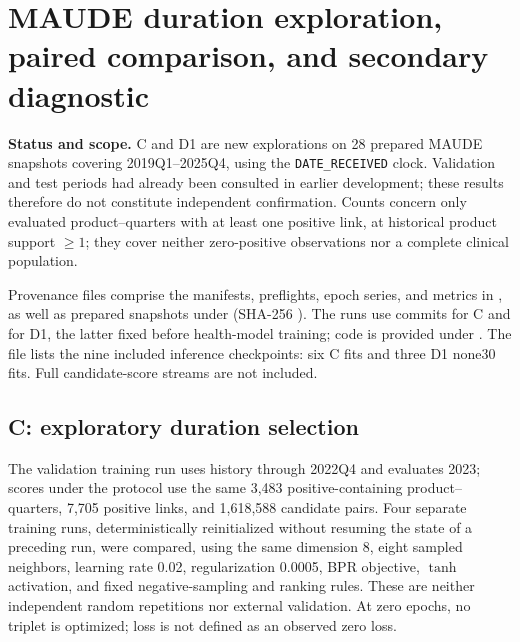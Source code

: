 \par{}
\section{MAUDE duration exploration, paired comparison, and secondary diagnostic}
\label{supp:post-rc1}

\textbf{Status and scope.} C and D1 are new explorations on 28 prepared MAUDE snapshots covering 2019Q1--2025Q4, using the \texttt{DATE\_RECEIVED} clock. Validation and test periods had already been consulted in earlier development; these results therefore do not constitute independent confirmation. Counts concern only evaluated product--quarters with at least one positive link, at historical product support $\geq1$; they cover neither zero-positive observations nor a complete clinical population.

Provenance files comprise the manifests, preflights, epoch series, and metrics in , as well as prepared snapshots under  (SHA-256 ). The runs use commits  for C and  for D1, the latter fixed before health-model training; code is provided under . The file  lists the nine included inference checkpoints: six C fits and three D1 none30 fits. Full candidate-score streams are not included.

\subsection{C: exploratory duration selection}

The validation training run uses history through 2022Q4 and evaluates 2023; scores under the protocol use the same 3,483 positive-containing product--quarters, 7,705 positive links, and 1,618,588 candidate pairs. Four separate training runs, deterministically reinitialized without resuming the state of a preceding run, were compared, using the same dimension 8, eight sampled neighbors, learning rate 0.02, regularization 0.0005, BPR objective, $\tanh$ activation, and fixed negative-sampling and ranking rules. These are neither independent random repetitions nor external validation. At zero epochs, no triplet is optimized; loss is not defined as an observed zero loss.

